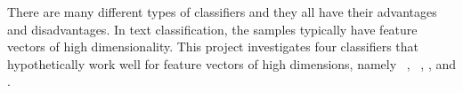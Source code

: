 There are many different types of classifiers and they all have their advantages and disadvantages. In text classification, the samples typically have feature vectors of high dimensionality. This project investigates four classifiers that hypothetically work well for feature vectors of high dimensions, namely \bn\ \nb, \mn\ \nb, \rf, and \svm. 
